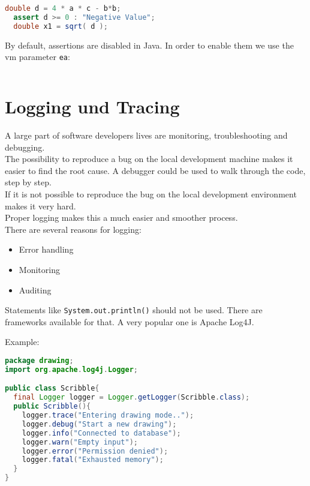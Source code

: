 \begin{lstlisting}[language=java, morekeywords={assert}]
  double d = 4 * a * c - b*b;
  assert d >= 0 : "Negative Value";
  double x1 = sqrt( d );
\end{lstlisting}

By default, assertions are disabled in Java. In order to enable them we use
the vm parameter \verb|ea|:

\begin{lstlisting}[language=csh]
% java -ea AssertionTest
\end{lstlisting}

%
\newslide
\section{Logging und Tracing}
A large part of software developers lives are monitoring,
troubleshooting and debugging.\\
The possibility to reproduce a bug on the local development
machine makes it easier to find the root cause. A debugger
could be used to walk through the code, step by step.\\
If it is not possible to reproduce the bug on the local
development environment makes it very hard.\\
Proper logging makes this a much easier and smoother process.\\
There are several reasons for logging:

\begin{itemize}
\item Error handling
\item Monitoring
\item Auditing
\end{itemize}

Statements like \verb|System.out.println()| should not be used. There
are frameworks available for that. A very popular one is Apache Log4J.

\vspace{3mm}

Example:
\begin{lstlisting}[language=java]
package drawing;
import org.apache.log4j.Logger;

public class Scribble{
  final Logger logger = Logger.getLogger(Scribble.class);
  public Scribble(){
    logger.trace("Entering drawing mode..");
    logger.debug("Start a new drawing");
    logger.info("Connected to database");
    logger.warn("Empty input");
    logger.error("Permission denied");
    logger.fatal("Exhausted memory");
  }
}
\end{lstlisting}



